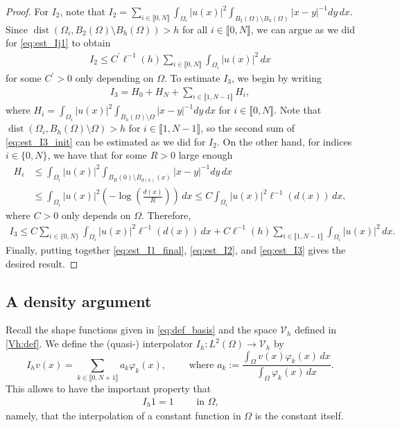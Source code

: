 \documentclass[11 pt]{article}
\newcommand\inter[1]{\llbracket #1\rrbracket}
\numberwithin{equation}{section}
\def\dist{\operatorname{dist}}
\begin{document}
\begin{proof}
For $I_2$, note that $I_2=\sum_{i\in\inter{0,N}}\int_{\Omega_i}|u(x)|^2\int_{B_2(\Omega)\setminus B_{h}(\Omega)}|x-y|^{-1}dy\,dx.$ Since $\dist(\Omega_i,B_2(\Omega)\setminus B_h(\Omega))>h$ for all $i\in\inter{0,N}$, we can argue as we did for \eqref{eq:est_Ij1} to obtain
%
\begin{align}\label{eq:est_I2}
    I_2\leq C^\prime\ell^{-1}(h)\sum_{i\in\inter{0,N}}\int_{\Omega_i}|u(x)|^2\,dx
\end{align}
%
for some $C^\prime>0$ only depending on $\Omega$. To estimate $I_3$, we begin by writing
%
\begin{align}\label{eq:est_I3_init}
    I_3=H_0+H_N+\sum_{i\in\inter{1,N-1}}H_i,
\end{align}
%
where $H_i=\int_{\Omega_i}|u(x)|^2\int_{B_h(\Omega)\setminus \Omega}|x-y|^{-1}dy\,dx$ for $i\in\inter{0,N}$. Note that $\dist(\Omega_i,B_h(\Omega)\setminus\Omega)>h$ for $i\in\inter{1,N-1}$, so the second sum of \eqref{eq:est_I3_init} can be estimated as we did for $I_2$. On the other hand, for indices $i\in\{0,N\}$, we have that for some $R>0$ large enough
%
\begin{align*}
    H_i&\leq \int_{\Omega_i}|u(x)|^2\int_{B_R(0)\setminus B_{d(x)}(x)}|x-y|^{-1}dy\,dx \\
    &\leq \int_{\Omega_i}|u(x)|^2\left(-\log\left(\tfrac{d(x)}{R}\right)\right)\,dx \leq C \int_{\Omega_i}|u(x)|^2\ell^{-1}(d(x))\,dx,
\end{align*}
%
where $C>0$ only depends on $\Omega$. Therefore,
%
\begin{align}\label{eq:est_I3}
    I_3\leq C \sum_{i\in\{0,N\}}\int_{\Omega_i}|u(x)|^2\ell^{-1}(d(x))\,dx + C\ell^{-1}(h)\sum_{i\in\inter{1,N-1}}\int_{\Omega_i}|u(x)|^2\,dx.
\end{align}
%
Finally, putting together \eqref{eq:est_I1_final}, \eqref{eq:est_I2}, and \eqref{eq:est_I3} gives the desired result. 
%
\end{proof}

\subsection{A density argument}


Recall the shape functions given in \eqref{eq:def_basis} and the space $\mathcal V_h$ defined in \eqref{Vh:def}. We define the (quasi-) interpolator $I_h:L^2(\Omega)\to \mathcal V_h$ by
%
\begin{equation}\label{eq:interpolator}
I_h v(x)=\sum_{k\in\inter{0,N+1}}a_k \varphi_k(x),\qquad \text{ where }
a_k:=\frac{\int_{\Omega}v(x)\varphi_k(x)\,dx}{\int_{\Omega}\varphi_k(x)\,dx}.
\end{equation}
%
This allows to have the important property that
\begin{align}\label{Ihc}
I_h 1 = 1\qquad \text{ in $\Omega$,}
\end{align}
namely, that the interpolation of a constant function in $\Omega$ is the constant itself.
\end{document}
